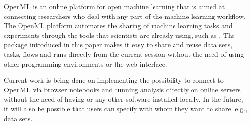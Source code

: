 OpenML is an online platform for open machine learning that is aimed at
connecting researchers who deal with any part of the machine learning
workflow. The OpenML platform automates the sharing of machine learning tasks and 
experiments through the tools that scientists are already using, such as . 
The  package introduced in this paper makes it easy to share and
reuse data sets, tasks, flows and runs directly from the current  session 
without the need of using other programming environments or the web interface.

Current work is being done on implementing the possibility to connect to OpenML 
via browser notebooks  and running analysis 
directly on online servers without the need of having  or any other 
software installed locally. In the future, it will also be possible that users 
can specify with whom they want to share, e.g., data sets.





